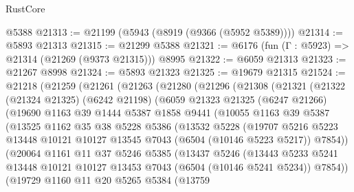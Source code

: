 \begin{lexlean}{RustCore}
\begin{coremodule}
    @5388
@21313 := @21199 (@5943 (@8919 (@9366 (@5952 @5389))))
@21314 := @5893 @21313
@21315 := @21299 @5388
@21321 := @6176 (fun (Γ : @5923) => @21314 (@21269 (@9373 @21315))) @8995
@21322 := @6059 @21313
@21323 := @21267 @8998
@21324 := @5893 @21323
@21325 := @19679 @21315
@21524 := @21218
    (@21259
      (@21261
        (@21263
          (@21280
            (@21296
              (@21308
                (@21321
                  (@21322
                    (@21324 @21325)
                    (@6242 @21198)
                    (@6059
                      @21323
                      @21325
                      (@6247 @21266)
                      (@19690
                        @1163
                        @39
                        @1444
                        @5387
                        @1858
                        @9441
                        (@10055
                          @1163
                          @39
                          @5387
                          (@13525
                            @1162
                            @35
                            @38
                            @5228
                            @5386
                            (@13532
                              @5228
                              (@19707
                                @5216
                                @5223
                                @13448
                                @10121
                                @10127
                                @13545
                                @7043
                                (@6504 (@10146 @5223 @5217))
                                @7854))
                            (@20064
                              @1161
                              @11
                              @37
                              @5246
                              @5385
                              (@13437
                                @5246
                                (@13443
                                  @5233
                                  @5241
                                  @13448
                                  @10121
                                  @10127
                                  @13453
                                  @7043
                                  (@6504 (@10146 @5241 @5234))
                                  @7854))
                              (@19729
                                @1160
                                @11
                                @20
                                @5265
                                @5384
                                (@13759

\end{coremodule}
\end{lexlean}
